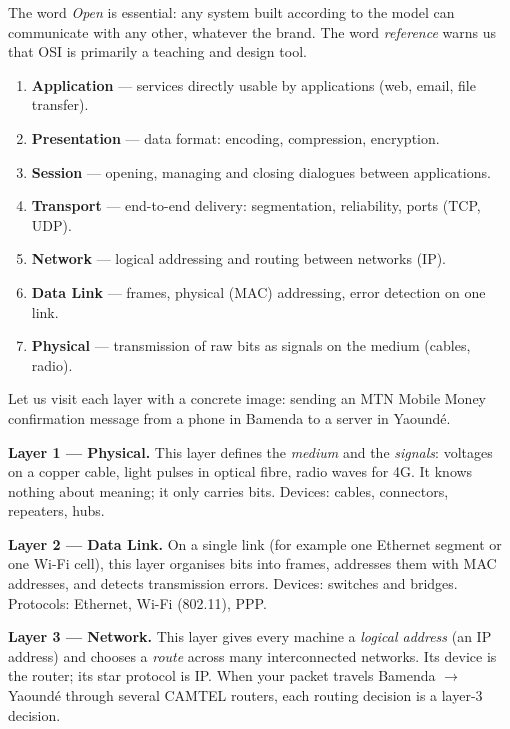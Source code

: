 \documentclass[11pt]{article}
\newcommand{\cle}[1]{{\popxbold\color{popdark}#1}}
\newcounter{popsec}
\newcounter{popsub}
\newcommand{\courssub}[1]{%
  \stepcounter{popsub}%
  \par\vspace{9pt}\noindent{\popxbold\fontsize{11.5}{13}\selectfont\color{popink}{\color{poporange}\thepopsec.\thepopsub}\hspace{6pt}#1}\par\nopagebreak\vspace{4pt}
}
\begin{document}
The word \emph{Open} is essential: any system built according to the model can communicate with any other, whatever the brand. The word \emph{reference} warns us that OSI is primarily a teaching and design tool.

\courssub{The Seven Layers}

\begin{aretenir}
\begin{enumerate}
\item[\textbf{7.}] \textbf{Application} — services directly usable by applications (web, email, file transfer).
\item[\textbf{6.}] \textbf{Presentation} — data format: encoding, compression, encryption.
\item[\textbf{5.}] \textbf{Session} — opening, managing and closing dialogues between applications.
\item[\textbf{4.}] \textbf{Transport} — end-to-end delivery: segmentation, reliability, ports (TCP, UDP).
\item[\textbf{3.}] \textbf{Network} — logical addressing and routing between networks (IP).
\item[\textbf{2.}] \textbf{Data Link} — frames, physical (MAC) addressing, error detection on one link.
\item[\textbf{1.}] \textbf{Physical} — transmission of raw bits as signals on the medium (cables, radio).
\end{enumerate}
\end{aretenir}

Let us visit each layer with a concrete image: sending an MTN Mobile Money confirmation message from a phone in Bamenda to a server in Yaoundé.

\textbf{Layer 1 — Physical.} This layer defines the \emph{medium} and the \emph{signals}: voltages on a copper cable, light pulses in optical fibre, radio waves for 4G. It knows nothing about meaning; it only carries bits. Devices: cables, connectors, \cle{repeaters}, \cle{hubs}.

\textbf{Layer 2 — Data Link.} On a single link (for example one Ethernet segment or one Wi-Fi cell), this layer organises bits into \cle{frames}, addresses them with \cle{MAC addresses}, and detects transmission errors. Devices: \cle{switches} and \cle{bridges}. Protocols: Ethernet, Wi-Fi (802.11), PPP.

\textbf{Layer 3 — Network.} This layer gives every machine a \emph{logical address} (an \cle{IP address}) and chooses a \emph{route} across many interconnected networks. Its device is the \cle{router}; its star protocol is \cle{IP}. When your packet travels Bamenda $\rightarrow$ Yaoundé through several CAMTEL routers, each routing decision is a layer-3 decision.
\end{document}
